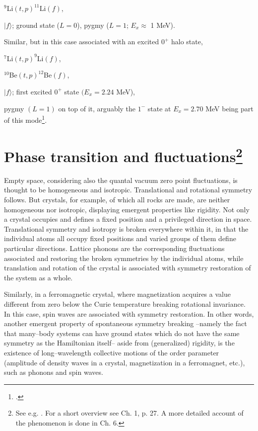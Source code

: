 \centerline{$^{9}$Li$(t,p)^{11}$Li$(f)$,}
\vspace{0.2cm}
\centerline{$|f\rangle$; ground state ($L=0$), pygmy ($L=1$; $E_x\approx$ 1 MeV).}
Similar, but in this case associated with an excited $0^+$ halo state,\\
\vspace{0.2cm}
 \centerline{$^{7}$Li$(t,p)^{9}$Li$(f)$,}
\vspace{0.3cm}
\centerline{$^{10}$Be$(t,p)^{12}$Be$(f)$,}
\vspace{0.2cm}
\centerline{$|f\rangle$; first excited $0^+$ state $(E_x=2.24$ MeV),}
\vspace{0.2cm}
pygmy $(L=1)$ on top of it, arguably the $1^-$ state at $E_x=2.70$ MeV being part of this mode\footnote{\cite{Iwasaki:00}.}.
\section[Phase transition and fluctuations]{Phase transition and fluctuations\footnote{See e.g. \cite{Anderson:84,Anderson:76,Anderson:64b}. For a short overview see \cite{Brink:05} Ch. 1, p. 27. A more detailed account of the phenomenon is done in Ch. 6.}}\label{C2AppE}
Empty space, considering also the quantal vacuum zero point fluctuations, is thought to be homogeneous and isotropic. Translational and rotational symmetry follows. But crystals, for example, of which all rocks are made, are neither homogeneous nor isotropic, displaying emergent properties like rigidity. Not only a crystal occupies and defines a fixed position and a privileged direction in space. Translational symmetry and isotropy is broken everywhere within it, in that the individual atoms all occupy fixed positions and varied groups of them define particular directions. Lattice phonons are the corresponding fluctuations associated and restoring the broken symmetries by the individual atoms, while translation and rotation of the crystal is associated with symmetry restoration of the system as a whole.


Similarly, in a ferromagnetic crystal, where magnetization acquires a value different from zero below the Curie temperature breaking rotational invariance. In this case, spin waves are associated with symmetry restoration. In other words, another emergent property of spontaneous symmetry breaking --namely the fact that many--body systems can have ground states which do not have the same symmetry as the Hamiltonian itself-- aside from (generalized) rigidity, is the existence of long--wavelength collective motions of the order parameter (amplitude of density waves in a crystal, magnetization in a ferromagnet, etc.), such as phonons and spin waves. 

